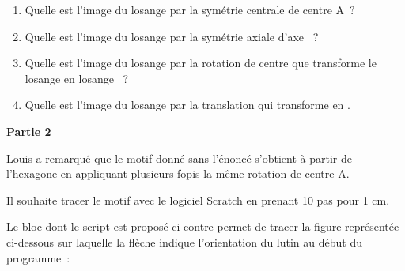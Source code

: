 \documentclass[exercice,a4]{thedocument}%
\begin{document}
    \begin{enumerate}
        \item Quelle est l'image du losange  par la symétrie centrale
        de centre A~?
        \item Quelle est l'image du losange  par la symétrie axiale
        d'axe ~?
        \item Quelle est l'image du losange  par la rotation
        de centre  que transforme le losange  en losange
        ~?
        \item Quelle est l'image du losange  par la translation qui
        transforme  en .
    \end{enumerate}
    \begin{flushleft}
        \textbf{Partie 2}\par\medskip\noindent
        Louis a remarqué que le motif donné sans l'énoncé s'obtient à partir de
        l'hexagone  en appliquant plusieurs fopis la même
        rotation de centre A.\par\noindent
        Il souhaite tracer le motif avec le logiciel Scratch en prenant 10 pas
        pour 1 cm.
    \end{flushleft}
    \noindent
    \begin{minipage}[c]{.55\linewidth}
        Le bloc dont le script est proposé ci-contre permet de tracer la figure
        représentée ci-dessous sur laquelle la flèche indique l'orientation du
        lutin au début du programme~:
        \begin{center}
        \end{center}
    \end{minipage}\hfill
\end{document}
